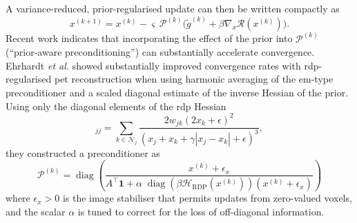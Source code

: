 A variance-reduced, prior-regularised update can then be written compactly as
\begin{equation}
    x^{(k+1)}
    = x^{(k)} - \varsigma\,\mathcal{P}^{(k)}
    \Big(\tilde g^{(k)} + \beta \nabla_x\mathcal{R}(x^{(k)})\Big).
\end{equation}
Recent work indicates that incorporating the effect of the prior into $\mathcal{P}^{(k)}$ (``prior-aware preconditioning'') can substantially accelerate convergence. Ehrhardt \textit{et al.} \cite{ehrhardtFastPETReconstruction2025a} showed substantially improved convergence rates with \gls{rdp}-regularised \gls{pet} reconstruction when using harmonic averaging of the \gls{em}-type preconditioner and a scaled diagonal estimate of the inverse Hessian of the prior. Using only the diagonal elements of the \gls{rdp} Hessian
\begin{equation}
    [\mathcal{H}_{\mathrm{RDP}}(x)]_{jj}
    = \sum_{k \in \mathcal{N}_j}
    \frac{2w_{jk}(2x_k+\epsilon)^2}
    {(x_j + x_k + \gamma |x_j - x_k|+\epsilon)^3},
\end{equation}
they constructed a preconditioner as
\begin{equation}
    \mathcal{P}^{(k)} = \operatorname{diag}\left( \frac{x^{(k)}+\epsilon_x}{A^\top \mathbf{1} + \alpha \;\operatorname{diag}\!\left(\beta \mathcal{H}_{\mathrm{RDP}}\left(x^{(k)}\right)\right)\left(x^{(k)}+\epsilon_x\right)}\right)
\end{equation}
where $\epsilon_x>0$ is the image stabiliser that permits updates from zero-valued voxels, and the scalar $\alpha$ is tuned to correct for the loss of off-diagonal information.

